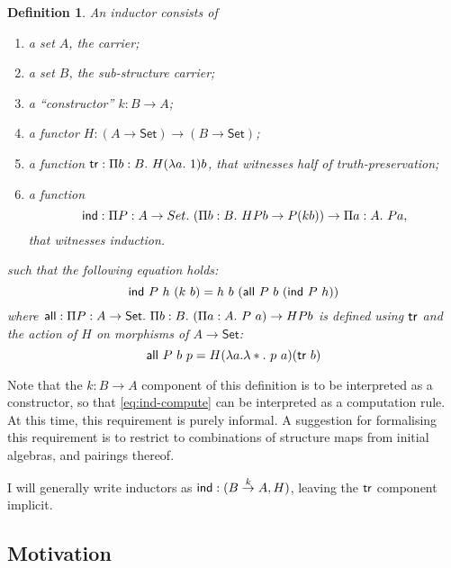 \documentclass{article}
\newtheorem{definition}{Definition}
\newcommand{\Set}{\mathsf{Set}}
\begin{document}
\begin{definition}
  An inductor consists of
  \begin{enumerate}
  \item a set $A$, the carrier;
  \item a set $B$, the sub-structure carrier;
  \item a ``constructor'' $k : B \to A$;
  \item a functor $H : (A \to \Set) \to (B \to \Set)$;
  \item a function $\truth : \Pi b : B.\ H(\lambda a.\ 1)b$, that
    witnesses half of truth-preservation;
  \item a function
    \begin{displaymath}
      \mathsf{ind} : \Pi P : A \to Set.\ (\Pi b : B.\ H P b \to P (k b)) \to \Pi a : A.\ P a,
    \end{displaymath}
    that witnesses induction.
  \end{enumerate}
  such that the following equation holds:
  \begin{equation}\label{eq:ind-compute}
    \mathsf{ind}\ P\ h\ (k\ b) = h\ b\ (\mathsf{all}\ P\ b\ (\mathsf{ind}\ P\ h)) 
  \end{equation}
  where $\all : \Pi P : A \to \Set.\ \Pi b : B.\ (\Pi a : A.\ P\ a) \to H P b$ is defined
  using $\mathsf{tr}$ and the action of $H$ on morphisms of $A \to \Set$:
  \begin{displaymath}
    \all\ P\ b\ p = H (\lambda a. \lambda *.\ p\ a) (\truth\ b)
  \end{displaymath}
\end{definition}

Note that the $k : B \to A$ component of this definition is to be
interpreted as a constructor, so that \autoref{eq:ind-compute} can be
interpreted as a computation rule. At this time, this requirement is
purely informal. A suggestion for formalising this requirement is to
restrict to combinations of structure maps from initial algebras, and
pairings thereof.

I will generally write inductors as $\mathsf{ind} : (B \stackrel{k}\to A, H)$,
leaving the $\mathsf{tr}$ component implicit.

\subsection{Motivation}
\end{document}
